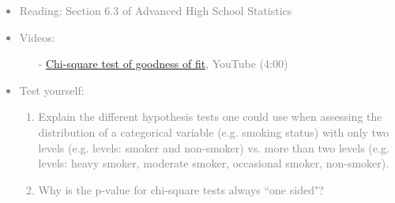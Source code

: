 \documentclass[11pt]{article}
\newcommand{\gray}[1]{\textcolor{gray}{#1}}
\begin{document}
\gray{
{\it
\vspace{-0.55cm}
\begin{itemize}
\renewcommand{\labelitemi}{{\textcolor{dark}{$\ast$}}}
\item Reading: Section 6.3 of Advanced High School Statistics
\item Videos:
\begin{itemize}
\item[-] \href{http://www.youtube.com/watch?v=b3o_hjWKgQw}{Chi-square test of goodness of fit}, YouTube (4:00)
\end{itemize}
\item Test yourself:
\begin{enumerate}
\item Explain the different hypothesis tests one could use when assessing the distribution of a categorical variable (e.g. smoking status) with only two levels (e.g. levels: smoker and non-smoker) vs. more than two levels (e.g. levels: heavy smoker, moderate smoker, occasional smoker, non-smoker).
\item Why is the p-value for chi-square tests always ``one sided"?
\end{enumerate}
\end{itemize}
}}

%
\end{document}
